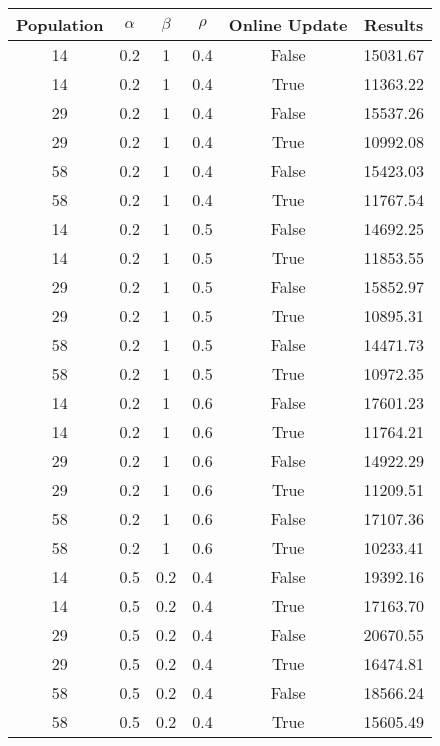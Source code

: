 \documentclass[12pt]{article}
\begin{document}
\begin{table}[h!]
\centering
\begin{tabular}{|c|c|c|c|c|c|}
\hline
\textbf{Population} & $\alpha$ & $\beta$ & $\rho$ & \textbf{Online Update} & \textbf{Results} \\ \hline
14  &  0.2  &  1  &  0.4  &  False  &  15031.67\\ \hline
14  &  0.2  &  1  &  0.4  &  True  &  11363.22\\ \hline
29  &  0.2  &  1  &  0.4  &  False  &  15537.26\\ \hline
29  &  0.2  &  1  &  0.4  &  True  &  10992.08\\ \hline
58  &  0.2  &  1  &  0.4  &  False  &  15423.03\\ \hline
58  &  0.2  &  1  &  0.4  &  True  &  11767.54\\ \hline
14  &  0.2  &  1  &  0.5  &  False  &  14692.25\\ \hline
14  &  0.2  &  1  &  0.5  &  True  &  11853.55\\ \hline
29  &  0.2  &  1  &  0.5  &  False  &  15852.97\\ \hline
29  &  0.2  &  1  &  0.5  &  True  &  10895.31\\ \hline
58  &  0.2  &  1  &  0.5  &  False  &  14471.73\\ \hline
58  &  0.2  &  1  &  0.5  &  True  &  10972.35\\ \hline
14  &  0.2  &  1  &  0.6  &  False  &  17601.23\\ \hline
14  &  0.2  &  1  &  0.6  &  True  &  11764.21\\ \hline
29  &  0.2  &  1  &  0.6  &  False  &  14922.29\\ \hline
29  &  0.2  &  1  &  0.6  &  True  &  11209.51\\ \hline
58  &  0.2  &  1  &  0.6  &  False  &  17107.36\\ \hline
58  &  0.2  &  1  &  0.6  &  True  &  10233.41\\ \hline
14  &  0.5  &  0.2  &  0.4  &  False  &  19392.16\\ \hline
14  &  0.5  &  0.2  &  0.4  &  True  &  17163.70\\ \hline
29  &  0.5  &  0.2  &  0.4  &  False  &  20670.55\\ \hline
29  &  0.5  &  0.2  &  0.4  &  True  &  16474.81\\ \hline
58  &  0.5  &  0.2  &  0.4  &  False  &  18566.24\\ \hline
58  &  0.5  &  0.2  &  0.4  &  True  &  15605.49\\ \hline

\end{tabular}
\end{table}
\end{document}
